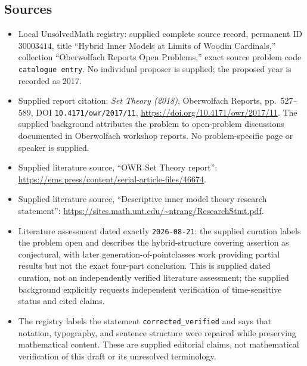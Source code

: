 \documentclass[11pt]{article}
\begin{document}
\subsection{Sources}
\begin{itemize}
\item Local UnsolvedMath registry: supplied complete source record, permanent ID \(30003414\), title ``Hybrid Inner Models at Limits of Woodin Cardinals,'' collection ``Oberwolfach Reports Open Problems,'' exact source problem code \texttt{catalogue entry}. No individual proposer is supplied; the proposed year is recorded as 2017.
\item Supplied report citation: \emph{Set Theory (2018)}, Oberwolfach Reports, pp.~527--589, DOI \texttt{10.4171/owr/2017/11}, \url{https://doi.org/10.4171/owr/2017/11}. The supplied background attributes the problem to open-problem discussions documented in Oberwolfach workshop reports. No problem-specific page or speaker is supplied.
\item Supplied literature source, ``OWR Set Theory report'': \url{https://ems.press/content/serial-article-files/46674}.
\item Supplied literature source, ``Descriptive inner model theory research statement'': \url{https://sites.math.unt.edu/~ntrang/ResearchStmt.pdf}.
\item Literature assessment dated exactly \texttt{2026-08-21}: the supplied curation labels the problem open and describes the hybrid-structure covering assertion as conjectural, with later generation-of-pointclasses work providing partial results but not the exact four-part conclusion. This is supplied dated curation, not an independently verified literature assessment; the supplied background explicitly requests independent verification of time-sensitive status and cited claims.
\item The registry labels the statement \texttt{corrected\_verified} and says that notation, typography, and sentence structure were repaired while preserving mathematical content. These are supplied editorial claims, not mathematical verification of this draft or its unresolved terminology.
\end{itemize}
\end{document}
